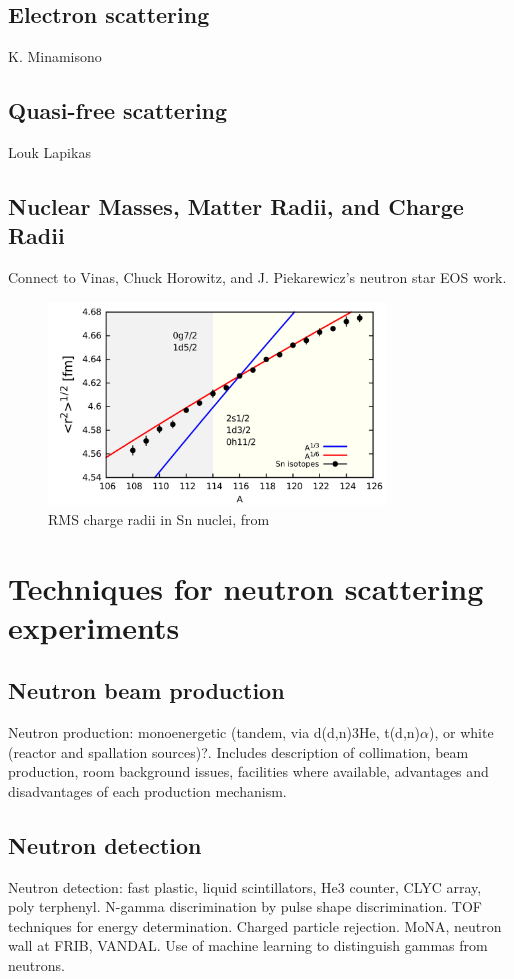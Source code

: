 \subsection{Electron scattering}
K. Minamisono


\subsection{Quasi-free scattering}
Louk Lapikas

\subsection{Nuclear Masses, Matter Radii, and Charge Radii}
Connect to Vinas, Chuck Horowitz, and J. Piekarewicz's neutron star EOS work.

\begin{figure}
    \includegraphics[width=0.8\textwidth]{figures/SnIsotopeRMSRadii.png}
    \caption{RMS charge radii in Sn nuclei, from \cite{Anselment1986}}
    \label{SnIsotopeShift}
\end{figure}

\section{Techniques for neutron scattering experiments}
\subsection{Neutron beam production}
Neutron production: monoenergetic (tandem, via d(d,n)3He, t(d,n)$\alpha$),
or white (reactor and spallation sources)?. Includes description of
collimation, beam production, room background issues, facilities where
available, advantages and disadvantages of each production mechanism.

\subsection{Neutron detection}
Neutron detection: fast plastic, liquid scintillators, He3 counter, CLYC array, poly
terphenyl. N-gamma discrimination by pulse shape discrimination. TOF techniques
for energy determination. Charged particle rejection. MoNA, neutron wall at
FRIB, VANDAL. Use of machine learning to distinguish gammas from neutrons.

